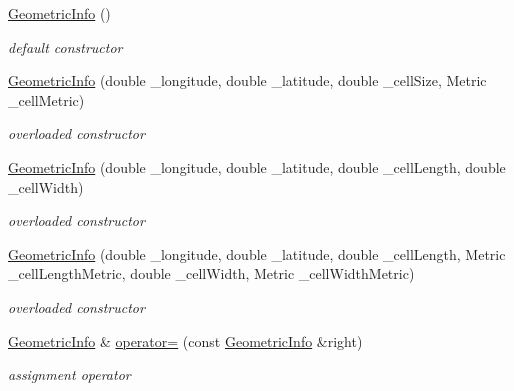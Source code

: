 \begin{DoxyCompactItemize}
\item 
\hypertarget{structGeometricInfo_a4bc847dd106d32107fde0c0d2fa00f77}{\hyperlink{structGeometricInfo_a4bc847dd106d32107fde0c0d2fa00f77}{\-Geometric\-Info} ()}\label{structGeometricInfo_a4bc847dd106d32107fde0c0d2fa00f77}

\begin{DoxyCompactList}\small\item\em default constructor \end{DoxyCompactList}\item 
\hypertarget{structGeometricInfo_aaa47b9cbf705ec7a20f6895721b8158f}{\hyperlink{structGeometricInfo_aaa47b9cbf705ec7a20f6895721b8158f}{\-Geometric\-Info} (double \-\_\-longitude, double \-\_\-latitude, double \-\_\-cell\-Size, \-Metric \-\_\-cell\-Metric)}\label{structGeometricInfo_aaa47b9cbf705ec7a20f6895721b8158f}

\begin{DoxyCompactList}\small\item\em overloaded constructor \end{DoxyCompactList}\item 
\hypertarget{structGeometricInfo_a996d4f1cb6b640cce436a982d400d0ad}{\hyperlink{structGeometricInfo_a996d4f1cb6b640cce436a982d400d0ad}{\-Geometric\-Info} (double \-\_\-longitude, double \-\_\-latitude, double \-\_\-cell\-Length, double \-\_\-cell\-Width)}\label{structGeometricInfo_a996d4f1cb6b640cce436a982d400d0ad}

\begin{DoxyCompactList}\small\item\em overloaded constructor \end{DoxyCompactList}\item 
\hypertarget{structGeometricInfo_a210973010d9c0e049e5ee7308b748358}{\hyperlink{structGeometricInfo_a210973010d9c0e049e5ee7308b748358}{\-Geometric\-Info} (double \-\_\-longitude, double \-\_\-latitude, double \-\_\-cell\-Length, \-Metric \-\_\-cell\-Length\-Metric, double \-\_\-cell\-Width, \-Metric \-\_\-cell\-Width\-Metric)}\label{structGeometricInfo_a210973010d9c0e049e5ee7308b748358}

\begin{DoxyCompactList}\small\item\em overloaded constructor \end{DoxyCompactList}\item 
\hypertarget{structGeometricInfo_a004bf2571153dca81c1a36950f1cb9e7}{\hyperlink{structGeometricInfo}{\-Geometric\-Info} \& \hyperlink{structGeometricInfo_a004bf2571153dca81c1a36950f1cb9e7}{operator=} (const \hyperlink{structGeometricInfo}{\-Geometric\-Info} \&right)}\label{structGeometricInfo_a004bf2571153dca81c1a36950f1cb9e7}

\begin{DoxyCompactList}\small\item\em assignment operator \end{DoxyCompactList}\end{DoxyCompactItemize}
